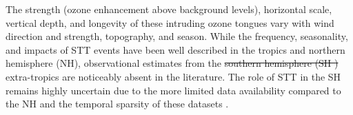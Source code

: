 \documentclass[acp, manuscript]{copernicus} %
\providecommand{\DIFadd}[1]{{\protect\color{blue}\uwave{#1}}} %
\providecommand{\DIFdel}[1]{{\protect\color{red}\sout{#1}}}                      %
\providecommand{\DIFaddbegin}{} %
\providecommand{\DIFaddend}{} %
\providecommand{\DIFdelbegin}{} %
\providecommand{\DIFdelend}{} %
\begin{document}
  The strength (ozone enhancement above background levels), horizontal scale, vertical depth, and longevity of these intruding ozone tongues vary with wind direction and strength, topography, and season.
  While the frequency, seasonality, and impacts of STT events have been well described in the tropics and northern hemisphere (NH), observational estimates from the \DIFdelbegin \DIFdel{southern hemisphere (SH ) }\DIFdelend \DIFaddbegin \DIFadd{SH }\DIFaddend extra-tropics are noticeably absent in the literature. 
  The role of STT in the SH remains highly uncertain due to the more limited data availability compared to the NH and the temporal sparsity of these datasets \citep{Mze2010, Thompson2014, Liu2015}. 
\end{document}
